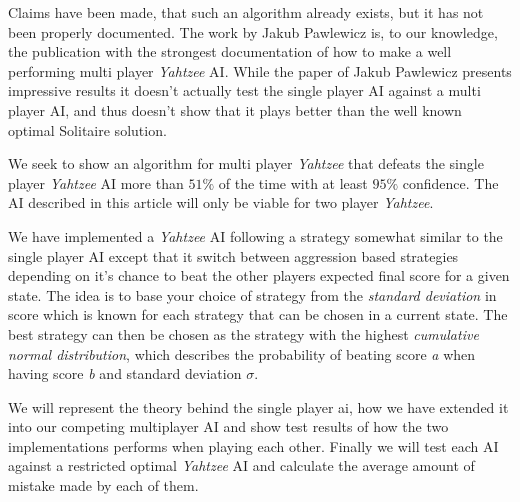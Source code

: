 Claims have been made, that such an algorithm already exists, but it has not been properly documented.
The work by Jakub Pawlewicz is, to our knowledge, the publication with the strongest documentation of how to make a well performing multi player \emph{Yahtzee} AI.
While the paper of Jakub Pawlewicz\cite{pawlewicz2011nearly} presents impressive results it doesn't actually test the single player AI against a multi player AI, and thus doesn't show that it plays better than the well known optimal Solitaire solution.

We seek to show an algorithm for multi player \emph{Yahtzee} that defeats the single player \emph{Yahtzee} AI more than $51\%$ of the time with at least $95\%$ confidence.
The AI described in this article will only be viable for two player \emph{Yahtzee}.

We have implemented a \emph{Yahtzee} AI following a strategy somewhat similar to the single player AI except that it switch between aggression based strategies depending on it's chance to beat the other players expected final score for a given state. The idea is to base your choice of strategy from the \emph{standard deviation} in score which is known for each strategy that can be chosen in a current state. The best strategy can then be chosen as the strategy with the highest \emph{cumulative normal distribution}, which describes the probability of beating score \emph{a} when having score \emph{b} and standard deviation $\sigma$.

We will represent the theory behind the single player ai, how we have extended it into our competing multiplayer AI and show test results of how the two implementations performs when playing each other. 
Finally we will test each AI against a restricted optimal \emph{Yahtzee} AI and calculate the average amount of mistake made by each of them.

